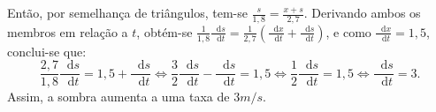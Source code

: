 \documentclass[12pt,a4paper]{article}
\newcommand*\diff{\mathop{}\!\mathrm{d}}
\begin{document}
\begin{enumerate}
Então, por semelhança de triângulos, tem-se $\frac{s}{1,8} = \frac{x+s}{2,7}$. Derivando ambos os membros em relação a $t$, obtém-se $\frac{1}{1,8}\frac{\diff{s}}{\diff{t}} = \frac{1}{2,7} \left( \frac{\diff{x}}{\diff{t}} + \frac{\diff{s}}{\diff{t}} \right)$, e como $\frac{\diff{x}}{\diff{t}} = 1,5$, conclui-se que:
\[
\frac{2,7}{1,8}\frac{\diff{s}}{\diff{t}} = 1,5 + \frac{\diff{s}}{\diff{t}}
\Leftrightarrow
\frac{3}{2}\frac{\diff{s}}{\diff{t}} -\frac{\diff{s}}{\diff{t}} = 1,5
\Leftrightarrow
\frac{1}{2}\frac{\diff{s}}{\diff{t}} = 1,5
\Leftrightarrow
\frac{\diff{s}}{\diff{t}} = 3.
\]
Assim, a sombra aumenta a uma taxa de $3m/s$.
\end{enumerate}
\end{document}
